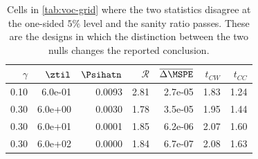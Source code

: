\begin{table}[htbp]
\centering
\caption{Cells in \cref{tab:voc-grid} where the two statistics disagree at the one-sided $5\%$ level and the sanity ratio passes. These are the designs in which the distinction between the two nulls changes the reported conclusion.}
\label{tab:voc-headline}
\small
\begin{tabular}{rrrrrrr}
\toprule
$\gamma$ & $\ztil$ & $\Psihatn$ & $\mathcal R$ & $\overline{\Delta\MSPE}$ & $t_{CW}$ & $t_{CC}$ \\
\midrule
0.10 & 6.0e-01 & 0.0093 & 2.81 & 2.7e-05 & 1.83 & 1.24 \\
0.30 & 6.0e+00 & 0.0030 & 1.78 & 3.5e-05 & 1.95 & 1.44 \\
0.30 & 6.0e+01 & 0.0001 & 1.85 & 6.2e-06 & 2.07 & 1.60 \\
0.30 & 6.0e+02 & 0.0000 & 1.84 & 6.7e-07 & 2.08 & 1.63 \\
\bottomrule
\end{tabular}
\end{table}
